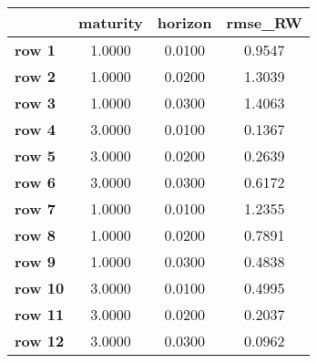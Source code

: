 \begin{tiny}\begin{tabular}{|l|c|c|c|}
\hline
&\textbf{maturity}&\textbf{horizon}&\textbf{rmse_RW}\\\hline
\textbf{row 1}&1.0000&0.0100&0.9547\\\hline
\textbf{row 2}&1.0000&0.0200&1.3039\\\hline
\textbf{row 3}&1.0000&0.0300&1.4063\\\hline
\textbf{row 4}&3.0000&0.0100&0.1367\\\hline
\textbf{row 5}&3.0000&0.0200&0.2639\\\hline
\textbf{row 6}&3.0000&0.0300&0.6172\\\hline
\textbf{row 7}&1.0000&0.0100&1.2355\\\hline
\textbf{row 8}&1.0000&0.0200&0.7891\\\hline
\textbf{row 9}&1.0000&0.0300&0.4838\\\hline
\textbf{row 10}&3.0000&0.0100&0.4995\\\hline
\textbf{row 11}&3.0000&0.0200&0.2037\\\hline
\textbf{row 12}&3.0000&0.0300&0.0962\\\hline
\end{tabular}
\end{tiny}